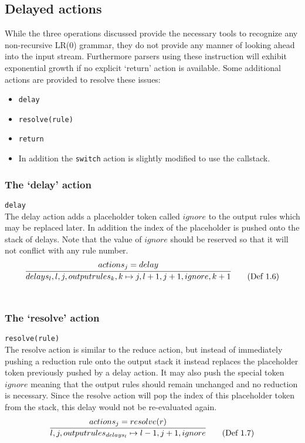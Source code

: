 \documentclass[11pt]{article}
\begin{document}
\subsection{Delayed actions}
While the three operations discussed provide the necessary tools to recognize any non-recursive LR(0) grammar, they do not provide any manner of looking ahead into the input stream. Furthermore parsers using these instruction will exhibit exponential growth if no explicit `return' action is available.
Some additional actions are provided to resolve these issues:
\begin{itemize}
\item \texttt{delay}
\item \texttt{resolve(rule)}
\item \texttt{return}
\item In addition the \texttt{switch} action is slightly modified to use the callstack.
\end{itemize}

\subsubsection{The `delay' action}
\texttt{delay}\\
The delay action adds a placeholder token called $ignore$ to the output rules which may be replaced later.
In addition the index of the placeholder is pushed onto the stack of delays.
Note that the value of $ignore$ should be reserved so that it will not conflict with any rule number.
\begin{equation}
\infer{delays_l, l, j, outputrules_k, k \mapsto j, l+1, j+1, ignore, k+1}{actions_j = delay} \tag{Def 1.6}
\end{equation}\\

\subsubsection{The `resolve' action}
\texttt{resolve(rule)}\\
The resolve action is similar to the reduce action, but instead of immediately pushing a reduction rule onto the output stack it instead replaces the placeholder token previously pushed by a delay action.
It may also push the special token $ignore$ meaning that the output rules should remain unchanged and no reduction is necessary. 
Since the resolve action will pop the index of this placeholder token from the stack, this delay would not be re-evaluated again.
\begin{equation}
\infer{l, j, outputrules_{delays_l} \mapsto l-1, j+1, ignore}{actions_j = resolve(r)} \tag{Def 1.7}
\end{equation}\\
\end{document}
